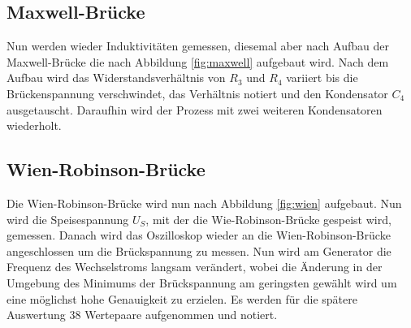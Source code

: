 \subsection{Maxwell-Brücke}

Nun werden wieder Induktivitäten gemessen, diesemal aber nach Aufbau der Maxwell-Brücke die nach Abbildung \ref{fig:maxwell} aufgebaut wird.
Nach dem Aufbau wird das Widerstandsverhältnis von $R_3$ und $R_4$ variiert bis die Brückenspannung verschwindet, das Verhältnis notiert und den Kondensator $C_4$ ausgetauscht.
Daraufhin wird der Prozess mit zwei weiteren Kondensatoren wiederholt.

\subsection{Wien-Robinson-Brücke}

Die Wien-Robinson-Brücke wird nun nach Abbildung \ref{fig:wien} aufgebaut. 
Nun wird die Speisespannung $U_S$, mit der die Wie-Robinson-Brücke gespeist wird, gemessen.
Danach wird das Oszilloskop wieder an die Wien-Robinson-Brücke angeschlossen um die Brückspannung zu messen.
Nun wird am Generator die Frequenz des Wechselstroms langsam verändert, wobei die Änderung in der Umgebung des Minimums der Brückspannung am geringsten gewählt wird um eine möglichst hohe Genauigkeit zu erzielen. 
Es werden für die spätere Auswertung 38 Wertepaare aufgenommen und notiert.



 
